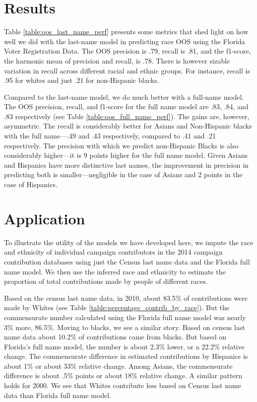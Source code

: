 \documentclass[12pt, letterpaper]{article}
\begin{document}
\section*{Results}

Table \ref{table:oos_last_name_perf} presents some metrics that shed light on how well we did with the last-name model in predicting race OOS using the Florida Voter Registration Data. The OOS precision is .79, recall is .81, and the f1-score, the harmonic mean of precision and recall, is .78. There is however sizable variation in recall across different racial and ethnic groups. For instance, recall is .95 for whites and just .21 for non-Hispanic blacks.



Compared to the last-name model, we do much better with a full-name model. The OOS precision, recall, and f1-score for the full name model are .83, .84, and .83 respectively (see Table \ref{table:oos_full_name_perf}). The gains are, however, asymmetric. The recall is considerably better for Asians and Non-Hispanic blacks with the full name---.49 and .43 respectively, compared to .41 and .21 respectively. The precision with which we predict non-Hispanic Blacks is also considerably higher---it is 9 points higher for the full name model. Given Asians and Hispanics have more distinctive last names, the improvement in precision in predicting both is smaller---negligible in the case of Asians and 2 points in the case of Hispanics.




\section*{Application}
To illustrate the utility of the models we have developed here, we impute the race and ethnicity of individual campaign contributors in the 2014 campaign contribution databases \citep{bonica2017database} using just the Census last name data and the Florida full name model. We then use the inferred race and ethnicity to estimate the proportion of total contributions made by people of different races. 

Based on the census last name data, in 2010, about 83.5\% of contributions were made by Whites (see Table \ref{table:percentage_contrib_by_race}). But the commensurate number calculated using the Florida full name model was nearly 3\% more, 86.5\%. Moving to blacks, we see a similar story. Based on census last name data about 10.2\% of contributions came from blacks. But based on Florida's full name model, the number is about 2.3\% lower, or a 22.2\% relative change. The commensurate difference in estimated contributions by Hispanics is about 1\% or about 33\% relative change. Among Asians, the commensurate difference is about .5\% points or about 18\% relative change. A similar pattern holds for 2000. We see that Whites contribute less based on Census last name data than Florida full name model.
\end{document}
